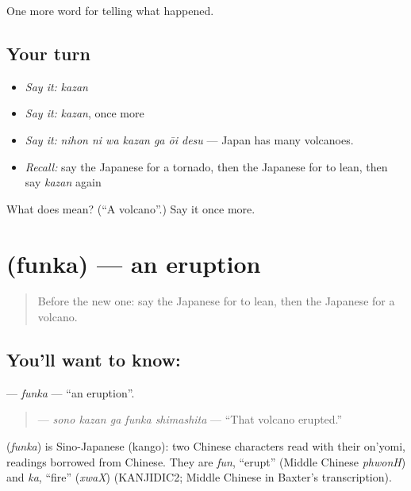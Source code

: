 \begin{grammarlens}[title={What you've built}]
One more word for telling what happened.
\end{grammarlens}

\subsection*{Your turn}
\begin{itemize}
\raggedright
  \item \emph{Say it:} \emph{kazan}
  \item \emph{Say it:} \emph{kazan}, once more
  \item \emph{Say it:} \emph{nihon ni wa kazan ga ōi desu} — Japan has many volcanoes.
  \item \emph{Recall:} say the Japanese for a tornado, then the Japanese for to lean, then say \emph{kazan} again
\end{itemize}

\begin{tcolorbox}[breakable,colback=teal!4,colframe=teal!35!black,title={Before you move on}]
What does  mean? (\textquotedblleft{}A volcano\textquotedblright{}.) Say it once more.
\end{tcolorbox}
\section[\texorpdfstring{\ja{ふんか} (funka)}{ふんか (funka)}]{ (funka) — an eruption}

\label{lesson:JA-C279-funka}



\begin{quote}
Before the new one: say the Japanese for to lean, then the Japanese for a volcano.
\end{quote}

\subsection*{You'll want to know: }
\textbf{} — \emph{funka} — \textquotedblleft{}an eruption\textquotedblright{}.

\begin{quote}
\textbf{  } — \emph{sono kazan ga funka shimashita} — \textquotedblleft{}That volcano erupted.\textquotedblright{}
\end{quote}

\begin{cousinweb}
\textbf{} (\emph{funka}) is Sino-Japanese (kango): two Chinese characters read with their on'yomi, readings borrowed from Chinese. They are \emph{fun}, \textquotedblleft{}erupt\textquotedblright{} (Middle Chinese \emph{phwonH}) and \emph{ka}, \textquotedblleft{}fire\textquotedblright{} (\emph{xwaX}) (KANJIDIC2; Middle Chinese in Baxter's transcription).
\end{cousinweb}


